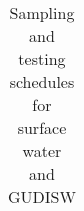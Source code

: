 \begin{landscape}
\begin{table}[h!]
\begin{tabular}{|lllll|}
\\ \hline
\end{tabular}
%
%
%
%
%
%
%
%
%
\caption{Sampling and testing schedules for surface water and GUDISW}

\end{table}
\end{landscape}

